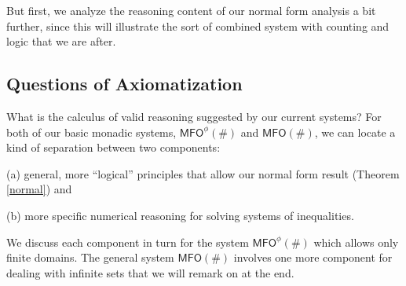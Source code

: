 \documentclass[12pt,oneside,reqno]{amsart}
\theoremstyle{definition}
\begin{document}
\vspace{1ex} 

But first, we analyze the reasoning content of our normal form analysis a bit further, since this will illustrate the sort of combined system with counting and logic that we are after.

\subsection{Questions of Axiomatization} \label{section:axioms} What is the calculus of valid reasoning suggested by our current systems? For both of our basic monadic systems, $\mathsf{MFO}^\phi(\#)$ and $\mathsf{MFO}(\#)$, we can locate a kind of separation between two components: 

\vspace{1ex}

(a) general, more ``logical'' principles that allow our normal form result (Theorem \ref{normal}) and

\vspace{0.5ex}

(b) more specific numerical reasoning  for solving systems of inequalities. 

\vspace{1ex}


We discuss each component in turn for the  system $\mathsf{MFO}^\phi(\#)$ which allows only finite domains.  The general system $\mathsf{MFO}(\#)$ involves one more component for dealing with infinite sets that we will remark on at the end.
\end{document}
